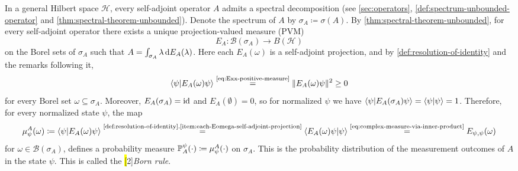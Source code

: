 In a general Hilbert space $\mathcal{H}$, every self-adjoint operator $A$ admits a spectral decomposition
(see \autoref{sec:operators}, \autoref{def:spectrum-unbounded-operator} and \autoref{thm:spectral-theorem-unbounded}).
Denote the spectrum of $A$ by $\sigma_A \coloneq \sigma(A)$.
By \autoref{thm:spectral-theorem-unbounded}, for every self-adjoint operator there exists a unique projection-valued measure (PVM)
\[
E_A \colon \mathcal B(\sigma_A) \to B(\mathcal H) %
\]
on the Borel sets of $\sigma_A$ such that
\(
A = \int_{\sigma_A} \lambda \,\mathrm{d} E_A(\lambda)
\).
Here each $E_A(\omega)$ is a self-adjoint projection, and by \autoref{def:resolution-of-identity} and the remarks following it,
\[
\braket{\psi|E_A(\omega)\psi} \overset{\text{\eqref{eq:Exx-positive-measure}}}{=} \|E_A(\omega)\psi\|^2 \ge 0
\]
for every Borel set $\omega \subseteq \sigma_A$.
Moreover,
\(
E_A(\sigma_A)=\operatorname{id}
\) and
\(
E_A(\emptyset)=0
\),
so for normalized $\psi$ we have
\(
\braket{\psi|E_A(\sigma_A)\psi} = \braket{\psi|\psi} = 1
\).
Therefore, 
for every normalized state $\psi$,
the map
\begin{equation}\label{eq:probability-measure-from-spectral-decomposition}
\mu_\psi^A(\omega)
\coloneq
\braket{\psi|E_A(\omega)\psi}
\overset{\text{\ref{def:resolution-of-identity}.\ref{item:each-Eomega-self-adjoint-projection}}}{=}
\braket{E_A(\omega)\psi|\psi}
\overset{\text{\eqref{eq:complex-measure-via-inner-product}}}{=}
E_{\psi,\psi}(\omega)
\end{equation}
for $\omega \in \mathcal{B}(\sigma_A)$, 
defines a probability measure $\operatorname{\mathbb{P}}_A^\psi(\cdot) \coloneq \mu_\psi^A(\cdot)$ on $\sigma_A$.
This is the probability distribution of the measurement outcomes of $A$ in the state $\psi$.
This is called the \hl[2]{\emph{Born rule}}.



